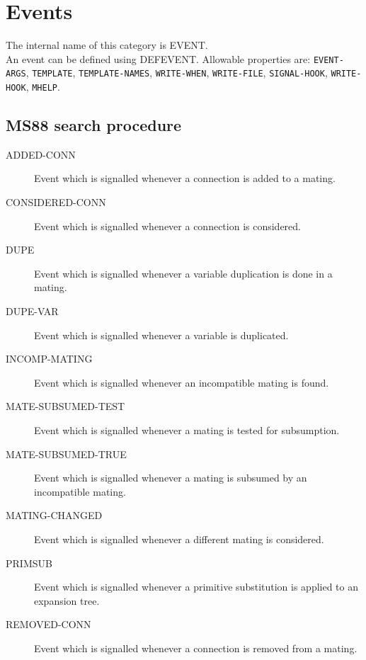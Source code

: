 \chapter{Events}
The internal name of this category is 
EVENT.\\
An event can be defined using DEFEVENT.
Allowable properties are: \texttt{EVENT-ARGS}, \texttt{TEMPLATE}, \texttt{TEMPLATE-NAMES}, \texttt{WRITE-WHEN}, \texttt{WRITE-FILE}, \texttt{SIGNAL-HOOK}, \texttt{WRITE-HOOK}, \texttt{MHELP}.

\section{MS88 search procedure}

\begin{description} 
\item[ADDED-CONN]  
Event which is signalled whenever a connection is added to a mating.

\item[CONSIDERED-CONN]  
Event which is signalled whenever a connection is considered.

\item[DUPE]  
Event which is signalled whenever a variable duplication is
done in a mating.

\item[DUPE-VAR]  
Event which is signalled whenever a variable is duplicated.

\item[INCOMP-MATING]  
Event which is signalled whenever an incompatible mating is found.

\item[MATE-SUBSUMED-TEST]  
Event which is signalled whenever a mating is tested for 
subsumption.

\item[MATE-SUBSUMED-TRUE]  
Event which is signalled whenever a mating is subsumed by
an incompatible mating.

\item[MATING-CHANGED]  
Event which is signalled whenever a different mating is considered.

\item[PRIMSUB]  
Event which is signalled whenever a primitive substitution
is applied to an expansion tree.

\item[REMOVED-CONN]  
Event which is signalled whenever a connection is removed from a mating.


\end{description}
